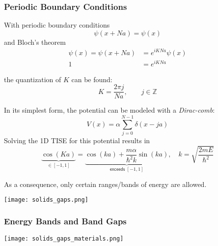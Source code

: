 \subsubsection{Periodic Boundary Conditions}
With periodic boundary conditions
\noindent\begin{equation*}
    \psi(x+Na) = \psi(x)
\end{equation*}
and Bloch's theorem
\noindent\begin{align*}
    \psi(x) = \psi(x+Na) & = e^{iKNa}\psi(x) \\
    1                    & =e^{iKNa}
\end{align*}

the quantization of $K$ can be found:
\noindent\begin{equation*}
    K=\frac{2\pi j}{Na}, \qquad j\in \mathbb{Z}
\end{equation*}


In its simplest form, the potential can be modeled with a \textit{Dirac-comb}:
\noindent\begin{equation*}
    V(x)=\alpha\sum_{j=0}^{N-1}\delta(x-ja)
\end{equation*}
Solving the 1D TISE for this potential results in
\noindent\begin{equation*}
    \underbrace{\cos(Ka)}_{\in [-1,1]} = \underbrace{\cos(ka) + \frac{m\alpha}{\hbar^2 k}\sin(ka)}_{\textsf{exceeds }[-1,1]}, \quad k=\sqrt{\frac{2mE}{\hbar^2}}
\end{equation*}

As a consequence, only certain ranges/bands of energy are allowed.
\begin{center}
    \texttt{[image: solids\_gaps.png]}
\end{center}

\subsubsection{Energy Bands and Band Gaps}

\begin{center}
    \texttt{[image: solids\_gaps\_materials.png]}
\end{center}